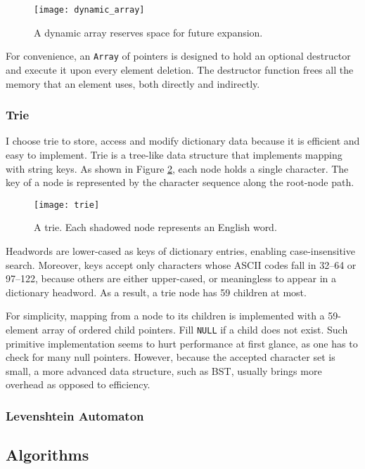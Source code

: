\documentclass[../main.tex]{subfiles}
\begin{document}
\begin{figure}
	\centering
	\texttt{[image: dynamic\_array]}
	\caption{A dynamic array reserves space for future expansion.}
	\label{fig:dynamic_array}
\end{figure}

For convenience, an \texttt{Array} of pointers is designed to hold an optional destructor and execute it upon every element deletion. The destructor function frees all the memory that an element uses, both directly and indirectly.

\subsubsection{Trie}

I choose trie to store, access and modify dictionary data because it is efficient and easy to implement. Trie is a tree-like data structure that implements mapping with string keys. As shown in Figure \ref{fig:trie}, each node holds a single character. The key of a node is represented by the character sequence along the root-node path.

\begin{figure}
	\centering
	\texttt{[image: trie]}
	\caption{A trie. Each shadowed node represents an English word.}
	\label{fig:trie}
\end{figure}

Headwords are lower-cased as keys of dictionary entries, enabling case-insensitive search. Moreover, keys accept only characters whose ASCII codes fall in 32--64 or 97--122, because others are either upper-cased, or meaningless to appear in a dictionary headword. As a result, a trie node has 59 children at most.

For simplicity, mapping from a node to its children is implemented with a 59-element array of ordered child pointers. Fill \texttt{NULL} if a child does not exist. Such primitive implementation seems to hurt performance at first glance, as one has to check for many null pointers. However, because the accepted character set is small, a more advanced data structure, such as BST, usually brings more overhead as opposed to efficiency.

\subsubsection{Levenshtein Automaton}

\subsection{Algorithms}
\end{document}
